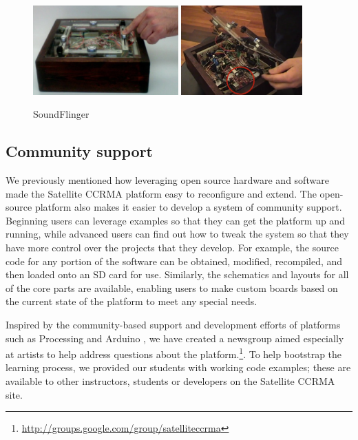 \begin{figure}[t]
	\centering
\includegraphics[height=1.35in]{Photos/SoundFlingerEd.eps}
\includegraphics[height=1.35in]{Photos/SoundFlingerFlipOpen.eps}
	\caption{SoundFlinger}
	\label{Berdahl:fig:SoundFlinger}
\end{figure}

\subsection{Community support}

We previously mentioned how leveraging open source hardware and software made the Satellite CCRMA platform easy to reconfigure and extend. The open-source platform also makes it easier to develop a system of community support.  Beginning users can leverage examples so that they can get the platform up and running, while advanced users can find out how to tweak the system so that they have more control over the projects that they develop.  For example, the source code for any portion of the software can be obtained, modified, recompiled, and then loaded onto an SD card for use.  Similarly, the schematics and layouts for all of the core parts are available, enabling users to make custom boards based on the current state of the platform to meet any special needs.

Inspired by the community-based support and development efforts of platforms such as Processing \cite{Reas:2003} and Arduino \cite{Mellis:2007}, we have created a newsgroup aimed especially at artists to help address questions about the platform.\footnote{\url{http://groups.google.com/group/satelliteccrma}}. To help bootstrap the learning process, we provided our students with working code examples; these are available to other instructors, students or developers on the Satellite CCRMA site.

